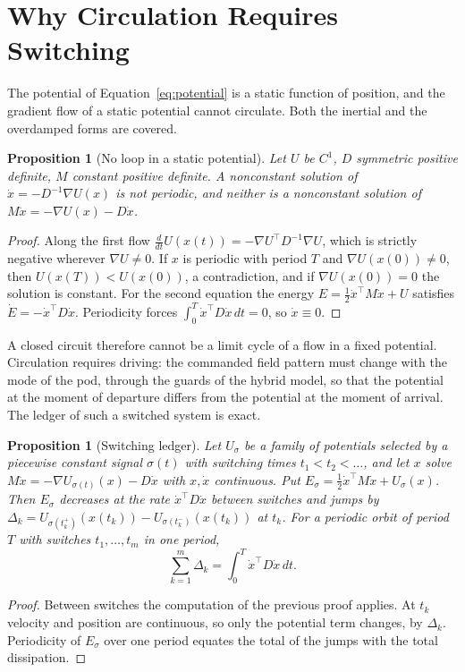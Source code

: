 \documentclass[11pt,openany]{book}
\theoremstyle{plain}
\newtheorem{proposition}[theorem]{Proposition}
\theoremstyle{definition}
\theoremstyle{remark}
\begin{document}
\section{Why Circulation Requires Switching}

The potential of Equation~\eqref{eq:potential} is a static function of position, and the gradient flow of a static potential cannot circulate. Both the inertial and the overdamped forms are covered.

\begin{proposition}[No loop in a static potential]
\label{prop:noloop}
Let $U$ be $C^1$, $D$ symmetric positive definite, $M$ constant positive definite. A nonconstant solution of $\dot x=-D^{-1}\nabla U(x)$ is not periodic, and neither is a nonconstant solution of $M\ddot x=-\nabla U(x)-D\dot x$.
\end{proposition}
\begin{proof}
Along the first flow $\frac{d}{dt}U(x(t))=-\nabla U^\top D^{-1}\nabla U$, which is strictly negative wherever $\nabla U\ne0$. If $x$ is periodic with period $T$ and $\nabla U(x(0))\ne0$, then $U(x(T))<U(x(0))$, a contradiction, and if $\nabla U(x(0))=0$ the solution is constant. For the second equation the energy $E=\frac12\dot x^\top M\dot x+U$ satisfies $\dot E=-\dot x^\top D\dot x$. Periodicity forces $\int_0^T\dot x^\top D\dot x\,dt=0$, so $\dot x\equiv0$.
\end{proof}

A closed circuit therefore cannot be a limit cycle of a flow in a fixed potential. Circulation requires driving: the commanded field pattern must change with the mode of the pod, through the guards of the hybrid model, so that the potential at the moment of departure differs from the potential at the moment of arrival. The ledger of such a switched system is exact.

\begin{proposition}[Switching ledger]
\label{prop:ledger}
Let $U_\sigma$ be a family of potentials selected by a piecewise constant signal $\sigma(t)$ with switching times $t_1<t_2<\dots$, and let $x$ solve $M\ddot x=-\nabla U_{\sigma(t)}(x)-D\dot x$ with $x,\dot x$ continuous. Put $E_\sigma=\frac12\dot x^\top M\dot x+U_\sigma(x)$. Then $E_\sigma$ decreases at the rate $\dot x^\top D\dot x$ between switches and jumps by $\Delta_k=U_{\sigma(t_k^+)}(x(t_k))-U_{\sigma(t_k^-)}(x(t_k))$ at $t_k$. For a periodic orbit of period $T$ with switches $t_1,\dots,t_m$ in one period,
\[
\sum_{k=1}^m\Delta_k=\int_0^T\dot x^\top D\dot x\,dt .
\]
\end{proposition}
\begin{proof}
Between switches the computation of the previous proof applies. At $t_k$ velocity and position are continuous, so only the potential term changes, by $\Delta_k$. Periodicity of $E_\sigma$ over one period equates the total of the jumps with the total dissipation.
\end{proof}
\end{document}
